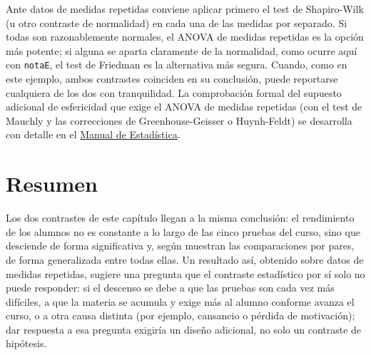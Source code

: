 \documentclass[
  spanish,
  a4paper,
]{scrreport}
\theoremstyle{definition}
\theoremstyle{definition}
\theoremstyle{remark}
\begin{document}
\begin{tcolorbox}[enhanced jigsaw, arc=.35mm, bottomrule=.15mm, bottomtitle=1mm, breakable, colback=white, colbacktitle=quarto-callout-tip-color!10!white, colframe=quarto-callout-tip-color-frame, coltitle=black, left=2mm, leftrule=.75mm, opacityback=0, opacitybacktitle=0.6, rightrule=.15mm, title=\textcolor{quarto-callout-tip-color}{\faLightbulb}\hspace{0.5em}{Tip}, titlerule=0mm, toprule=.15mm, toptitle=1mm]

Ante datos de medidas repetidas conviene aplicar primero el test de
Shapiro-Wilk (u otro contraste de normalidad) en cada una de las medidas
por separado. Si todas son razonablemente normales, el ANOVA de medidas
repetidas es la opción más potente; si alguna se aparta claramente de la
normalidad, como ocurre aquí con \texttt{notaE}, el test de Friedman es
la alternativa más segura. Cuando, como en este ejemplo, ambos
contrastes coinciden en su conclusión, puede reportarse cualquiera de
los dos con tranquilidad. La comprobación formal del supuesto adicional
de esfericidad que exige el ANOVA de medidas repetidas (con el test de
Mauchly y las correcciones de Greenhouse-Geisser o Huynh-Feldt) se
desarrolla con detalle en el
\href{https://aprendeconalf.es/estadistica-manual/}{Manual de
Estadística}.

\end{tcolorbox}

\section{Resumen}\label{resumen-1}

Los dos contrastes de este capítulo llegan a la misma conclusión: el
rendimiento de los alumnos no es constante a lo largo de las cinco
pruebas del curso, sino que desciende de forma significativa y, según
muestran las comparaciones por pares, de forma generalizada entre todas
ellas. Un resultado así, obtenido sobre datos de medidas repetidas,
sugiere una pregunta que el contraste estadístico por sí solo no puede
responder: si el descenso se debe a que las pruebas son cada vez más
difíciles, a que la materia se acumula y exige más al alumno conforme
avanza el curso, o a otra causa distinta (por ejemplo, cansancio o
pérdida de motivación); dar respuesta a esa pregunta exigiría un diseño
adicional, no solo un contraste de hipótesis.
\end{document}
